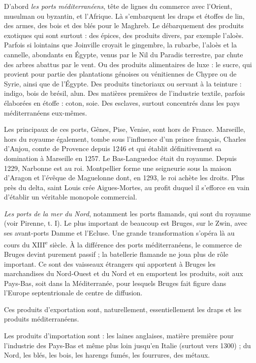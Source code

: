 \documentclass[french,twoside]{book} %
\newcommand{\labelchar}[1]{{\color{rubric}\bf #1}}
\begin{document}
\noindent \labelchar{a)} D’abord {\itshape les ports méditerranéens}, tête de lignes du commerce avec l’Orient, musulman ou byzantin, et l’Afrique. Là s’embarquent les draps et étoffes de lin, des armes, des bois et des blés pour le Maghreb. Le débarquement des produits exotiques qui sont surtout : des épices, des produits divers, par exemple l’aloès. Parfois si lointains que Joinville croyait le gingembre, la rubarbe, l’aloès et la cannelle, abondants en Égypte, venus par le Nil du Paradis terrestre, par chute des arbres abattus par le vent. Ou des produits alimentaires de luxe : le sucre, qui provient pour partie des plantations génoises ou vénitiennes de Chypre ou de Syrie, ainsi que de l’Égypte. Des produits tinctoriaux ou servant à la teinture : indigo, bois de brésil, alun. Des matières premières de l’industrie textile, parfois élaborées en étoffe : coton, soie. Des esclaves, surtout concentrés dans les pays méditerranéens eux-mêmes.\par
Les principaux de ces ports, Gênes, Pise, Venise, sont hors de France. Marseille, hors du royaume également, tombe sous l’influence d’un prince français, Charles d’Anjou, comte de Provence depuis 1246 et qui établit définitivement sa domination à Marseille en 1257. Le Bas-Languedoc était du royaume. Depuis 1229, Narbonne est au roi. Montpellier forme une seigneurie sous la maison d’Aragon et l’évêque de Maguelonne dont, en 1293, le roi achète les droits. Plus près du delta, saint Louis crée Aigues-Mortes, au profit duquel il s’efforce en vain d’établir un véritable monopole commercial.\par
\bigbreak
\noindent \labelchar{b)} {\itshape Les ports de la mer du Nord}, notamment les ports flamands, qui sont du royaume (voir Pirenne, t. I). Le plus important de  
\label{p85} beaucoup est Bruges, sur le Zwin, avec ses avant-ports Damme et l’Ecluse. Une grande transformation s’opéra là au cours du XIII\textsuperscript{e} siècle. À la différence des ports méditerranéens, le commerce de Bruges devint purement passif ; la batellerie flamande ne joua plus de rôle important. Ce sont des vaisseaux étrangers qui apportent à Bruges les marchandises du Nord-Ouest et du Nord et en emportent les produits, soit aux Pays-Bas, soit dans la Méditerranée, pour lesquels Bruges fait figure dans l’Europe septentrionale de centre de diffusion.\par
Ces produits d’exportation sont, naturellement, essentiellement les draps et les produits méditerranéens.\par
Les produits d’importation sont : les laines anglaises, matière première pour l’industrie des Pays-Bas et même plus loin jusqu’en Italie (surtout vers 1300) ; du Nord, les blés, les bois, les harengs fumés, les fourrures, des métaux.\par
\end{document}
